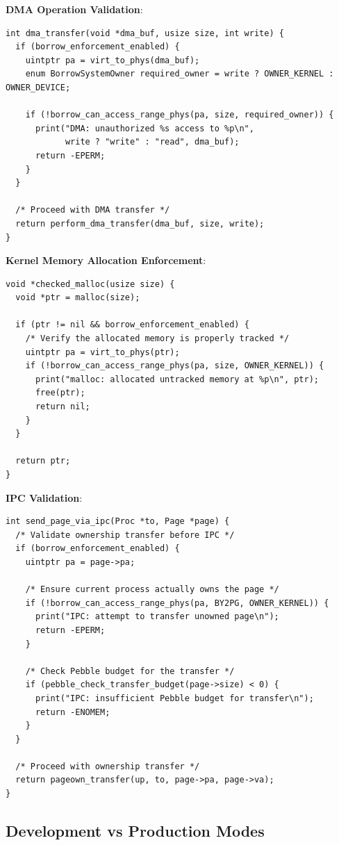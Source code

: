 \documentclass[11pt,letterpaper]{article}
\begin{document}
\textbf{DMA Operation Validation}:

\begin{lstlisting}
int dma_transfer(void *dma_buf, usize size, int write) {
  if (borrow_enforcement_enabled) {
    uintptr pa = virt_to_phys(dma_buf);
    enum BorrowSystemOwner required_owner = write ? OWNER_KERNEL : OWNER_DEVICE;
    
    if (!borrow_can_access_range_phys(pa, size, required_owner)) {
      print("DMA: unauthorized %s access to %p\n", 
            write ? "write" : "read", dma_buf);
      return -EPERM;
    }
  }
  
  /* Proceed with DMA transfer */
  return perform_dma_transfer(dma_buf, size, write);
}
\end{lstlisting}

\textbf{Kernel Memory Allocation Enforcement}:

\begin{lstlisting}
void *checked_malloc(usize size) {
  void *ptr = malloc(size);
  
  if (ptr != nil && borrow_enforcement_enabled) {
    /* Verify the allocated memory is properly tracked */
    uintptr pa = virt_to_phys(ptr);
    if (!borrow_can_access_range_phys(pa, size, OWNER_KERNEL)) {
      print("malloc: allocated untracked memory at %p\n", ptr);
      free(ptr);
      return nil;
    }
  }
  
  return ptr;
}
\end{lstlisting}

\textbf{IPC Validation}:

\begin{lstlisting}
int send_page_via_ipc(Proc *to, Page *page) {
  /* Validate ownership transfer before IPC */
  if (borrow_enforcement_enabled) {
    uintptr pa = page->pa;
    
    /* Ensure current process actually owns the page */
    if (!borrow_can_access_range_phys(pa, BY2PG, OWNER_KERNEL)) {
      print("IPC: attempt to transfer unowned page\n");
      return -EPERM;
    }
    
    /* Check Pebble budget for the transfer */
    if (pebble_check_transfer_budget(page->size) < 0) {
      print("IPC: insufficient Pebble budget for transfer\n");
      return -ENOMEM;
    }
  }
  
  /* Proceed with ownership transfer */
  return pageown_transfer(up, to, page->pa, page->va);
}
\end{lstlisting}

\subsection{Development vs Production Modes}
\end{document}
